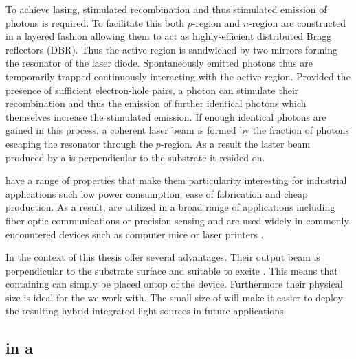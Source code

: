 		To achieve lasing, stimulated recombination and thus stimulated emission of photons is required. To facilitate this both $p$-region and $n$-region are constructed in a layered fashion allowing them to act as highly-efficient distributed Bragg reflectors (DBR). Thus the active region is sandwiched by two mirrors forming the resonator of the laser diode. Spontaneously emitted photons thus are temporarily trapped continuously interacting with the active region. Provided the presence of sufficient electron-hole pairs, a photon can stimulate their recombination and thus the emission of further identical photons which themselves increase the stimulated emission. If enough identical photons are gained in this process, a coherent laser beam is formed by the fraction of photons escaping the resonator through the $p$-region. As a result the laster beam produced by a \VCSEL is perpendicular to the substrate it resided on.

		\VCSELs have a range of properties that make them particularity interesting for industrial applications such low power consumption, ease of fabrication and cheap production. As a result, \VCSELs are utilized in a broad range of applications including fiber optic communications or precision sensing and are used widely in commonly encountered devices such as computer mice or laser printers \cite{Weidenfeld}.

		In the context of this thesis \VCSELs offer several advantages. Their output beam is perpendicular to the substrate surface and suitable to excite \sivs. This means that \nds containing \sivs can simply be placed ontop of the device. Furthermore their physical size is ideal for the \nds we work with. The small size of \VCSELs will make it easier to deploy the resulting hybrid-integrated light sources in future applications.

	\subsection{\siv in a \Vcsel}

